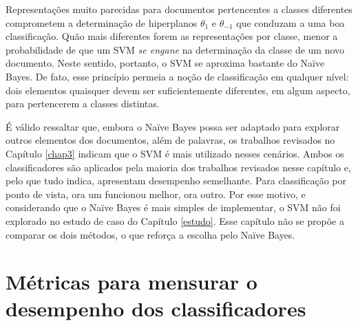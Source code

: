 Representações muito parecidas para documentos pertencentes a classes diferentes comprometem a determinação de hiperplanos \ensuremath{\theta_1} e \ensuremath{\theta_{-1}} que conduzam a uma boa classificação. Quão mais diferentes forem as representações por classe, menor a probabilidade de que um SVM \emph{se engane} na determinação da classe de um novo documento. Neste sentido, portanto, o SVM se aproxima bastante do Naïve Bayes. De fato, esse princípio permeia a noção de classificação em qualquer nível: dois elementos quaisquer devem ser suficientemente diferentes, em algum aspecto, para pertencerem a classes distintas.

É válido ressaltar que, embora o Naïve Bayes possa ser adaptado para explorar outros elementos dos documentos, além de palavras, os trabalhos revisados no Capítulo \ref{chap3} indicam que o SVM é mais utilizado nesses cenários. Ambos os classificadores são aplicados pela maioria dos trabalhos revisados nesse capítulo e, pelo que tudo indica, apresentam desempenho semelhante. Para classificação por ponto de vista, ora um funcionou melhor, ora outro. Por esse motivo, e considerando que o Naïve Bayes é mais simples de implementar, o SVM não foi explorado no estudo de caso do Capítulo \ref{estudo}. Esse capítulo não se propõe a comparar os dois métodos, o que reforça a escolha pelo Naïve Bayes.  





\section{Métricas para mensurar o desempenho dos classificadores}
\label{metricas}

